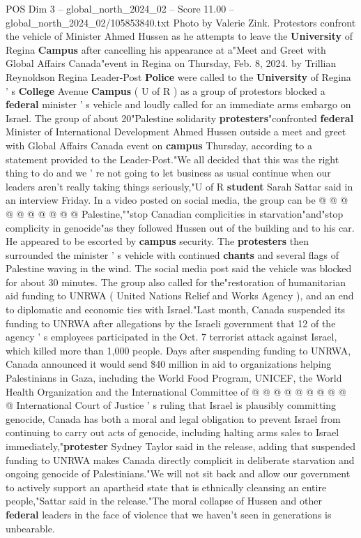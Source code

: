 \begin{textsample}{POS Dim 3 – global\_north\_2024\_02 – Score 11.00 – global\_north\_2024\_02/105853840.txt}  \label{ex:f3_pos_253}
Photo by Valerie Zink.
Protestors confront the vehicle of Minister Ahmed Hussen as he attempts to leave the \textbf{University} of Regina \textbf{Campus} after cancelling his appearance at a"Meet and Greet with Global Affairs Canada"event in Regina on Thursday, Feb. 8, 2024. by Trillian Reynoldson Regina Leader-Post \textbf{Police} were called to the \textbf{University} of Regina ' s \textbf{College} Avenue \textbf{Campus} ( U of R ) as a group of protestors blocked a \textbf{federal} minister ' s vehicle and loudly called for an immediate arms embargo on Israel.
The group of about 20"Palestine solidarity \textbf{protesters}"confronted \textbf{federal} Minister of International Development Ahmed Hussen outside a meet and greet with Global Affairs Canada event on \textbf{campus} Thursday, according to a statement provided to the Leader-Post."We all decided that this was the right thing to do and we ' re not going to let business as usual continue when our leaders aren't really taking things seriously,"U of R \textbf{student} Sarah Sattar said in an interview Friday.
In a video posted on social media, the group can be @ @ @ @ @ @ @ @ @ @ Palestine,""stop Canadian complicities in starvation"and"stop complicity in genocide"as they followed Hussen out of the building and to his car.
He appeared to be escorted by \textbf{campus} security.
The \textbf{protesters} then surrounded the minister ' s vehicle with continued \textbf{chants} and several flags of Palestine waving in the wind.
The social media post said the vehicle was blocked for about 30 minutes.
The group also called for the"restoration of humanitarian aid funding to UNRWA ( United Nations Relief and Works Agency ), and an end to diplomatic and economic ties with Israel."Last month, Canada suspended its funding to UNRWA after allegations by the Israeli government that 12 of the agency ' s employees participated in the Oct. 7 terrorist attack against Israel, which killed more than 1,000 people.
Days after suspending funding to UNRWA, Canada announced it would send \$40 million in aid to organizations helping Palestinians in Gaza, including the World Food Program, UNICEF, the World Health Organization and the International Committee of @ @ @ @ @ @ @ @ @ @ International Court of Justice ' s ruling that Israel is plausibly committing genocide, Canada has both a moral and legal obligation to prevent Israel from continuing to carry out acts of genocide, including halting arms sales to Israel immediately,"\textbf{protester} Sydney Taylor said in the release, adding that suspended funding to UNRWA makes Canada directly complicit in deliberate starvation and ongoing genocide of Palestinians."We will not sit back and allow our government to actively support an apartheid state that is ethnically cleansing an entire people,"Sattar said in the release."The moral collapse of Hussen and other \textbf{federal} leaders in the face of violence that we haven't seen in generations is unbearable.

\end{textsample}
